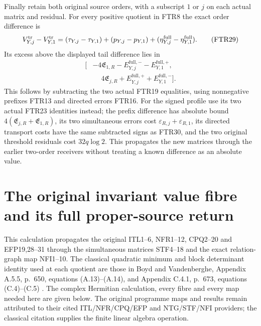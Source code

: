 \documentclass[11pt,a4paper]{article}
\begin{document}
Finally retain both original source orders, with a subscript $1$
or $j$ on each actual matrix and residual. For every positive
quotient in FTR8 the exact order difference is
\[
 V_{Y,j}^{\rm tr}-V_{Y,1}^{\rm tr}
 =(\tau_{Y,j}-\tau_{Y,1})+(p_{Y,j}-p_{Y,1})
                  +(\eta_{Y,j}^{\rm full}-\eta_{Y,1}^{\rm full}).
                                                               \tag{FTR29}
\]
Its excess above the displayed tail difference lies in
\[
\begin{split}
 [&-4\mathfrak E_{1,R}-E_{Y,j}^{\mathrm{full},-}
                             -E_{Y,1}^{\mathrm{full},+},\\
  &\phantom{-}4\mathfrak E_{j,R}+E_{Y,j}^{\mathrm{full},+}
                             +E_{Y,1}^{\mathrm{full},-}].        
\end{split}\tag{FTR30}
\]
This follows by subtracting the two actual FTR19 equalities,
using nonnegative prefixes FTR13 and directed errors FTR16.
For the signed profile use its two actual FTR23 identities instead;
the prefix difference has absolute bound
$4(\mathfrak E_{j,R}+\mathfrak E_{1,R})$, its two simultaneous
errors cost $\varepsilon_{R,j}+\varepsilon_{R,1}$, its directed
transport costs have the same subtracted signs as FTR30, and
the two original threshold residuals cost $32q\log2$.
This propagates the new matrices through the earlier two-order
receivers without treating a known difference as an absolute value.

\endgroup

\begingroup
\section{The original invariant value fibre and its full proper-source return}
\label{sec:PRD}

This calculation propagates the original ITL1--6, NFR1--12,
CPQ2--20 and EFP19,28--31 through the simultaneous matrices
STF4--18 and the exact relation-graph map NFI1--10. The classical
quadratic minimum and block determinant identity used at each quotient
are those in Boyd and Vandenberghe, Appendix A.5.5, p.~650,
equations (A.13)--(A.14), and Appendix C.4.1, p.~673,
equations (C.4)--(C.5) \cite{human:boyd-vandenberghe}.
The complex Hermitian calculation, every fibre and every map needed
here are given below. The original programme maps and results remain
attributed to their cited ITL/NFR/CPQ/EFP and NTG/STF/NFI providers;
the classical citation supplies the finite linear algebra operation.
\end{document}
